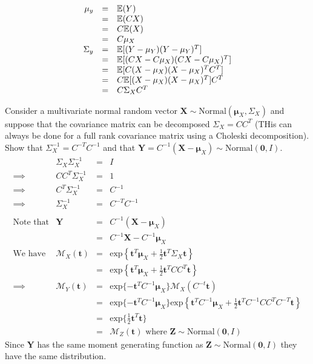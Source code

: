 \documentclass[11pt,a4paper]{article}
\begin{document}
\apart
\[\begin{array}{rcl}
\mu_y&=&\mathbb{E}(Y)\\
&=&\mathbb{E}(CX)\\
&=&C\mathbb{E}(X)\\
&=&C\mu_X\\
\Sigma_y&=&\mathbb{E}[(Y-\mu_Y)(Y-\mu_Y)^T]\\
&=&\mathbb{E}[(CX-C\mu_X)(CX-C\mu_X)^T]\\
&=&\mathbb{E}[C(X-\mu_X)(X-\mu_X)^TC^T]\\
&=&C\mathbb{E}[(X-\mu_X)(X-\mu_X)^T]C^T\\
&=&C\Sigma_XC^T
\end{array}\]

\qpart
Consider a multivariate normal random vector $\textbf{X}\sim\text{Normal}(\pmb\mu_X,\Sigma_X)$ and suppose that the covariance matrix can be decomposed $\Sigma_X=CC^T$ (THis can always be done for a full rank covariance matrix using a Choleski decomposition). Show that $\Sigma_X^{-1}=C^{-T}C^{-1}$ and that ${\textbf{Y}=C^{-1}(\textbf{X}-\pmb\mu_X)\sim\text{Normal}(\textbf{0},I)}$.\\

\apart
\[\begin{array}{rrcl}
&\Sigma_X\Sigma_X^{-1}&=&I\\
\implies&CC^T\Sigma_X^{-1}&=&1\\
\implies&C^T\Sigma_X^{-1}&=&C^{-1}\\
\implies&\Sigma_X^{-1}&=&C^{-T}C^{-1}\\
\\
\text{Note that}&\textbf{Y}&=&C^{-1}(\textbf{X}-\pmb\mu_X)\\
&&=&C^{-1}\textbf{X}-C^{-1}\pmb\mu_X\\
\text{We have}&\mathcal{M}_X(\textbf{t})&=&\text{exp}\left\{\textbf{t}^T\pmb\mu_X+\frac{1}{2}\textbf{t}^T\Sigma_X\textbf{t}\right\}\\
&&=&\text{exp}\left\{\textbf{t}^T\pmb\mu_X+\frac{1}{2}\textbf{t}^TCC^T\textbf{t}\right\}\\
\implies&\mathcal{M}_Y(\textbf{t})&=&\text{exp}\{-\textbf{t}^TC^{-1}\pmb\mu_X\}\mathcal{M}_X(C^{-t}\textbf{t})\\
&&=&\text{exp}\{-\textbf{t}^TC^{-1}\pmb\mu_X\}\text{exp}\left\{\textbf{t}^TC^{-1}\pmb\mu_X+\frac{1}{2}\textbf{t}^TC^{-1}CC^TC^{-T}\textbf{t}\right\}\\
&&=&\text{exp}\{\frac{1}{2}\textbf{t}^T\textbf{t}\}\\
&&=&\mathcal{M}_Z(\textbf{t})\text{ where }\textbf{Z}\sim\text{Normal}(\pmb0,I)
\end{array}\]
Since $\textbf{Y}$ has the same moment generating function as $\textbf{Z}\sim\text{Normal}(\pmb0,I)$ they have the same distribution.\\
\end{document}
